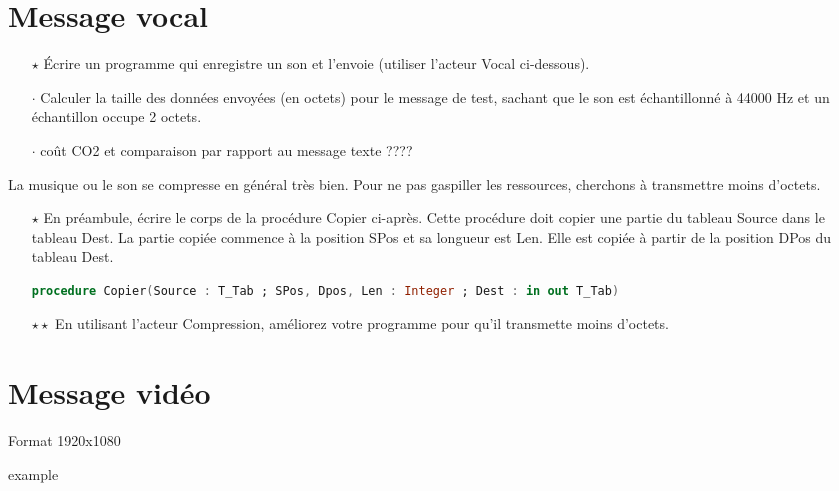 \documentclass[a4paper]{article}
\begin{document}
\section{Message vocal}

\begin{itemize}
\item[$\star$] Écrire un programme qui enregistre un son et l'envoie (utiliser l'acteur Vocal ci-dessous).
\item[$\cdot$] Calculer la taille des données envoyées (en octets) pour le message de test, sachant que le son est échantillonné à 44000 Hz et un échantillon occupe 2 octets.
\item[$\cdot$] coût CO2 et comparaison par rapport au message texte ????
\end{itemize}

La musique ou le son se compresse en général très bien. Pour ne pas gaspiller les ressources, cherchons à transmettre moins d'octets.

\begin{itemize}
\item[$\star$] En préambule, écrire le corps de la procédure Copier ci-après. Cette procédure doit copier une partie du tableau Source dans le tableau Dest.
  La partie copiée commence à la position SPos et sa longueur est Len. Elle est copiée à partir de la position DPos du tableau Dest.

  \begin{lstlisting}[language=Ada]
    procedure Copier(Source : T_Tab ; SPos, Dpos, Len : Integer ; Dest : in out T_Tab) 
  \end{lstlisting}
  
  \item[$\star\star$] En utilisant l'acteur Compression, améliorez votre programme pour qu'il transmette moins d'octets.
  \end{itemize}





\section{Message vidéo}



Format 1920x1080


 example
\end{document}
